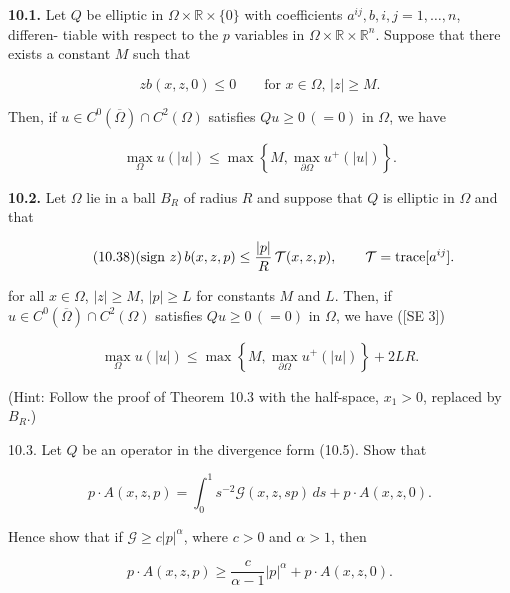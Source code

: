 \textbf{10.1.} Let $Q$ be elliptic in $\Omega \times \mathbb{R} \times \{0\}$ with coefficients $a^{ij}, b, i,j=1,\dots,n$, differen-
tiable with respect to the $p$ variables in $\Omega \times \mathbb{R} \times \mathbb{R}^n$. Suppose that there exists a
constant $M$ such that

\begin{equation}
\tag{10.36}
zb(x,z,0)\le 0 \qquad \text{for $x\in\Omega$, $|z|\ge M$.}
\end{equation}

Then, if $u\in C^0(\overline{\Omega})\cap C^2(\Omega)$ satisfies $Qu\ge 0\,(=0)$ in $\Omega$, we have

\begin{equation}
\tag{10.37}
\max_{\Omega} u(|u|)\le \max\left\{M,\max_{\partial\Omega} u^+(|u|)\right\}.
\end{equation}

\medskip

\textbf{10.2.} Let $\Omega$ lie in a ball $B_R$ of radius $R$ and suppose that $Q$ is elliptic in $\Omega$ and that

\begin{equation}
\tag{10.38}
(\text{sign } z)\, b(x,z,p)\le \frac{|p|}{R}\,\mathcal{T}(x,z,p), \qquad \mathcal{T}=\operatorname{trace}[a^{ij}].
\end{equation}

for all $x\in\Omega$, $|z|\ge M$, $|p|\ge L$ for constants $M$ and $L$. Then, if $u\in C^0(\overline{\Omega})\cap C^2(\Omega)$
satisfies $Qu\ge 0\,(=0)$ in $\Omega$, we have ([SE 3])

\begin{equation}
\tag{10.39}
\max_{\Omega} u(|u|)\le \max\left\{M,\max_{\partial\Omega} u^+(|u|)\right\}+2LR.
\end{equation}

\noindent
(Hint: Follow the proof of Theorem 10.3 with the half-space, $x_1>0$, replaced by
$B_R$.)


10.3. Let $Q$ be an operator in the divergence form (10.5). Show that

\begin{equation}\tag{10.40}
p\cdot A(x,z,p)=\int_{0}^{1}s^{-2}\mathcal{G}(x,z,sp)\,ds+p\cdot A(x,z,0).
\end{equation}

Hence show that if $\mathcal{G}\ge c|p|^{\alpha}$, where $c>0$ and $\alpha>1$, then

\begin{equation}\tag{10.41}
p\cdot A(x,z,p)\ge \frac{c}{\alpha-1}|p|^{\alpha}+p\cdot A(x,z,0).
\end{equation}

